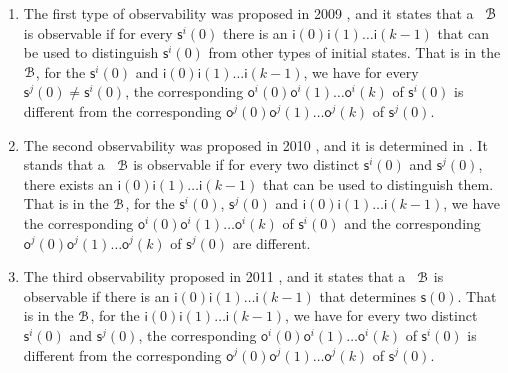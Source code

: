 
\begin{enumerate}
	\item The first type of observability was proposed in 2009 \cite{cheng2009controllability}, and it states that a \BCN\ ${\mathcal{B}}$ is observable if for every $\mathsf{s}^{i}(0)$ there is an $\mathsf{i}(0)\mathsf{i}(1)\ldots\mathsf{i}(k-1)$ that can be used to distinguish $\mathsf{s}^{i}(0)$ from other types of initial states. That is in the ${\mathcal{B}}$, for the $\mathsf{s}^{i}(0)$ and $\mathsf{i}(0)$$\mathsf{i}(1)\ldots$$\mathsf{i}(k-1)$, we have for every $\mathsf{s}^{j}(0)\ne\mathsf{s}^{i}(0)$, the corresponding $\mathsf{o}^{i}(0)$$\mathsf{o}^{i}(1)\ldots$$\mathsf{o}^{i}(k)$ of $\mathsf{s}^{i}(0)$ is different from the corresponding $\mathsf{o}^{j}(0)$$\mathsf{o}^{j}(1)\ldots$$\mathsf{o}^{j}(k)$ of $\mathsf{s}^{j}(0)$. %
	\item 
	The second observability was proposed in 2010 \cite{Zhao2010Input}, and it is determined in \cite{Li2015Controllability}. It stands that a \BCN\ ${\mathcal{B}}$ is observable if for every two distinct $\mathsf{s}^{i}(0)$ and $\mathsf{s}^{j}(0)$, there exists an $\mathsf{i}(0)$$\mathsf{i}(1)\ldots$$\mathsf{i}(k-1)$ that can be used to distinguish them. That is in the ${\mathcal{B}}$, for the $\mathsf{s}^{i}(0)$, $\mathsf{s}^{j}(0)$ and $\mathsf{i}(0)\mathsf{i}(1)\ldots\mathsf{i}(k-1)$, we have the corresponding $\mathsf{o}^{i}(0)\mathsf{o}^{i}(1)\ldots\mathsf{o}^{i}(k)$ of $\mathsf{s}^{i}(0)$ and the corresponding $\mathsf{o}^{j}(0)\mathsf{o}^{j}(1)\ldots\mathsf{o}^{j}(k)$ of $\mathsf{s}^{j}(0)$ are different. %
	\item The third observability proposed in 2011 \cite{Cheng2011Identification}, and it states that a \BCN\ ${\mathcal{B}}$ is observable if there is an $\mathsf{i}(0)$$\mathsf{i}(1)\ldots$$\mathsf{i}(k-1)$ that determines $\mathsf{s}(0)$. That is in the ${\mathcal{B}}$, for the $\mathsf{i}(0)$$\mathsf{i}(1)\ldots$$\mathsf{i}(k-1)$, we have for every two distinct $\mathsf{s}^{i}(0)$ and $\mathsf{s}^{j}(0)$, the corresponding $\mathsf{o}^{i}(0)$$\mathsf{o}^{i}(1)\ldots$$\mathsf{o}^{i}(k)$ of $\mathsf{s}^{i}(0)$ is different from the corresponding $\mathsf{o}^{j}(0)$$\mathsf{o}^{j}(1)\ldots$$\mathsf{o}^{j}(k)$ of $\mathsf{s}^{j}(0)$.
	

\end{enumerate}
